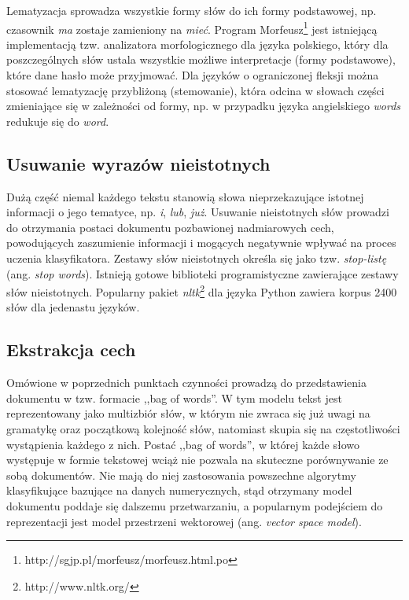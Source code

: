 \documentclass{pracamgr}
\begin{document}
Lematyzacja sprowadza wszystkie formy słów do ich formy podstawowej, np. czasownik \textit{ma} zostaje zamieniony na \textit{mieć}. Program Morfeusz\footnote{http://sgjp.pl/morfeusz/morfeusz.html.po} jest istniejącą implementacją tzw. analizatora morfologicznego dla języka polskiego, który dla poszczególnych słów ustala wszystkie możliwe interpretacje (formy podstawowe), które dane hasło może przyjmować. Dla języków o ograniczonej fleksji można stosować lematyzację przybliżoną (stemowanie), która odcina w słowach części zmieniające się w zależności od formy, np. w przypadku języka angielskiego \textit{words} redukuje się do \textit{word}. 

\subsection{Usuwanie wyrazów nieistotnych}

Dużą część niemal każdego tekstu stanowią słowa nieprzekazujące istotnej informacji o jego tematyce, np. \textit{i}, \textit{lub}, \textit{już}. Usuwanie nieistotnych słów prowadzi do otrzymania postaci dokumentu pozbawionej nadmiarowych cech, powodujących zaszumienie informacji i mogących negatywnie wpływać na proces uczenia klasyfikatora. Zestawy słów nieistotnych określa się jako tzw. \textit{stop-listę} (ang. \textit{stop words}). Istnieją gotowe biblioteki programistyczne zawierające zestawy słów nieistotnych. Popularny pakiet \textit{nltk}\footnote{http://www.nltk.org/} dla języka Python zawiera korpus 2400 słów dla jedenastu języków.

\subsection{Ekstrakcja cech}

Omówione w poprzednich punktach czynności prowadzą do przedstawienia dokumentu w tzw. formacie ,,bag of words''. W tym modelu tekst jest reprezentowany jako multizbiór słów, w którym nie zwraca się już uwagi na gramatykę oraz początkową kolejność słów, natomiast skupia się na częstotliwości wystąpienia każdego z nich. Postać ,,bag of words'', w której każde słowo występuje w formie tekstowej wciąż nie pozwala na skuteczne porównywanie ze sobą dokumentów. Nie mają do niej zastosowania powszechne algorytmy klasyfikujące bazujące na danych numerycznych, stąd otrzymany model dokumentu poddaje się dalszemu przetwarzaniu, a popularnym podejściem do reprezentacji jest model przestrzeni wektorowej (ang. \textit{vector space model}).
\end{document}
